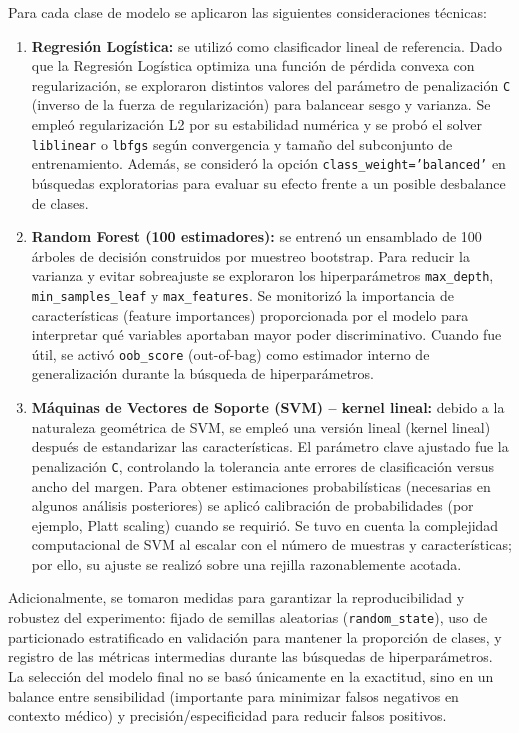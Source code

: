 \documentclass[conference]{IEEEtran}
\begin{document}
Para cada clase de modelo se aplicaron las siguientes consideraciones técnicas:
\begin{enumerate}
\item \textbf{Regresión Logística:} se utilizó como clasificador lineal de referencia. Dado que la Regresión Logística optimiza una función de pérdida convexa con regularización, se exploraron distintos valores del parámetro de penalización \texttt{C} (inverso de la fuerza de regularización) para balancear sesgo y varianza. Se empleó regularización L2 por su estabilidad numérica y se probó el solver \texttt{liblinear} o \texttt{lbfgs} según convergencia y tamaño del subconjunto de entrenamiento. Además, se consideró la opción \texttt{class\_weight='balanced'} en búsquedas exploratorias para evaluar su efecto frente a un posible desbalance de clases.

\item \textbf{Random Forest (100 estimadores):} se entrenó un ensamblado de 100 árboles de decisión construidos por muestreo bootstrap. Para reducir la varianza y evitar sobreajuste se exploraron los hiperparámetros \texttt{max\_depth}, \texttt{min\_samples\_leaf} y \texttt{max\_features}. Se monitorizó la importancia de características (feature importances) proporcionada por el modelo para interpretar qué variables aportaban mayor poder discriminativo. Cuando fue útil, se activó \texttt{oob\_score} (out-of-bag) como estimador interno de generalización durante la búsqueda de hiperparámetros.

\item \textbf{Máquinas de Vectores de Soporte (SVM) -- kernel lineal:} debido a la naturaleza geométrica de SVM, se empleó una versión lineal (kernel lineal) después de estandarizar las características. El parámetro clave ajustado fue la penalización \texttt{C}, controlando la tolerancia ante errores de clasificación versus ancho del margen. Para obtener estimaciones probabilísticas (necesarias en algunos análisis posteriores) se aplicó calibración de probabilidades (por ejemplo, Platt scaling) cuando se requirió. Se tuvo en cuenta la complejidad computacional de SVM al escalar con el número de muestras y características; por ello, su ajuste se realizó sobre una rejilla razonablemente acotada.
\end{enumerate}

Adicionalmente, se tomaron medidas para garantizar la reproducibilidad y robustez del experimento: fijado de semillas aleatorias (\texttt{random\_state}), uso de particionado estratificado en validación para mantener la proporción de clases, y registro de las métricas intermedias durante las búsquedas de hiperparámetros. La selección del modelo final no se basó únicamente en la exactitud, sino en un balance entre sensibilidad (importante para minimizar falsos negativos en contexto médico) y precisión/especificidad para reducir falsos positivos.
\end{document}
